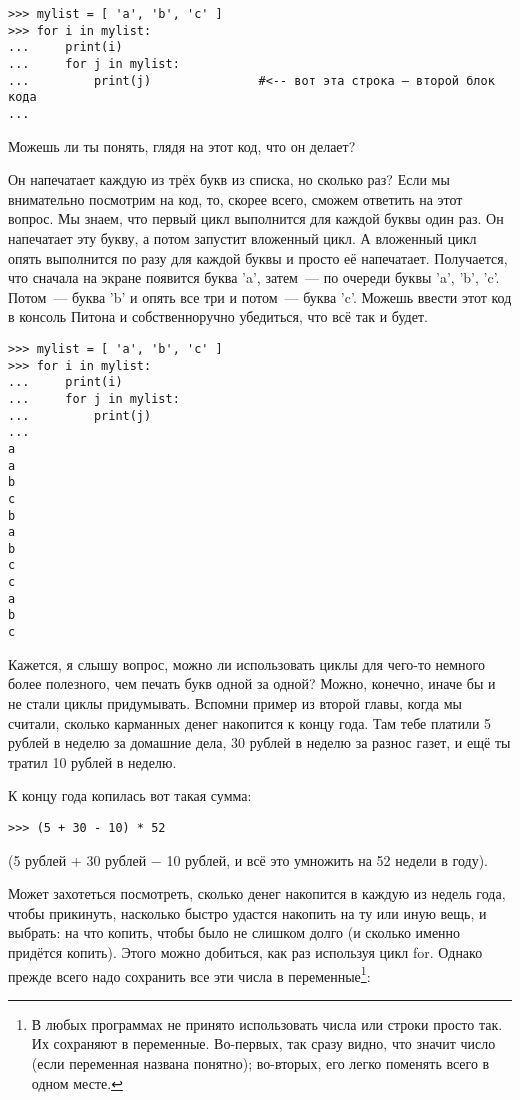\begin{listing}
\begin{verbatim}
>>> mylist = [ 'a', 'b', 'c' ]
>>> for i in mylist:
...     print(i)
...     for j in mylist:
...         print(j)               #<-- вот эта строка — второй блок кода
...
\end{verbatim}
\end{listing}

Можешь ли ты понять, глядя на этот код, что он делает?

Он напечатает каждую из трёх букв из списка, но сколько раз? Если мы внимательно посмотрим на код, то, скорее всего, сможем ответить на этот вопрос. Мы знаем, что первый цикл  выполнится для каждой буквы один раз. Он напечатает эту букву, а потом запустит вложенный цикл. А вложенный цикл опять выполнится по разу для каждой буквы и просто её напечатает. Получается, что сначала на экране появится буква 'a', затем — по очереди буквы 'a', 'b', 'c'. Потом — буква 'b' и опять все три и потом — буква 'c'. Можешь ввести этот код в консоль Питона и собственноручно убедиться, что всё так и будет.

\begin{listing}
\begin{verbatim}
>>> mylist = [ 'a', 'b', 'c' ]
>>> for i in mylist:
...     print(i)
...     for j in mylist:
...         print(j)
... 
a
a
b
c
b
a
b
c
c
a
b
c
\end{verbatim}
\end{listing}

Кажется, я слышу вопрос, можно ли использовать циклы для чего-то немного более полезного, чем печать букв одной за одной? Можно, конечно, иначе бы и не стали циклы придумывать. Вспомни пример из второй главы, когда мы считали, сколько карманных денег накопится к концу года. Там тебе платили 5 рублей в неделю за домашние дела, 30 рублей в неделю за разнос газет, и ещё ты тратил 10 рублей в неделю.

К концу года копилась вот такая сумма:

\begin{listing}
\begin{verbatim}
>>> (5 + 30 - 10) * 52
\end{verbatim}
\end{listing}

\noindent
(5 рублей + 30 рублей − 10 рублей, и всё это умножить на 52 недели в году).

Может захотеться посмотреть, сколько денег накопится в каждую из недель года, чтобы прикинуть, насколько быстро удастся накопить на ту или иную вещь, и выбрать: на что копить, чтобы было не слишком долго (и сколько именно придётся копить). Этого можно добиться, как раз используя цикл for. Однако прежде всего надо сохранить все эти числа в переменные\footnote{В любых программах не принято использовать числа или строки просто так. Их сохраняют в переменные. Во-первых, так сразу видно, что значит число (если переменная названа понятно); во-вторых, его легко поменять всего в одном месте.}:

